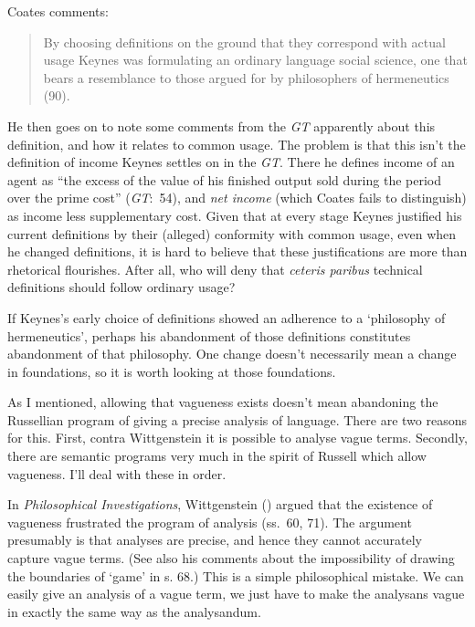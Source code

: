 \documentclass[
  10pt,
  letterpaper,
  DIV=11,
  numbers=noendperiod,
  twoside]{scrartcl}
\begin{document}
Coates comments:

\begin{quote}
By choosing definitions on the ground that they correspond with actual
usage Keynes was formulating an ordinary language social science, one
that bears a resemblance to those argued for by philosophers of
hermeneutics (90).
\end{quote}

He then goes on to note some comments from the \emph{GT} apparently
about this definition, and how it relates to common usage. The problem
is that this isn't the definition of income Keynes settles on in the
\emph{GT}. There he defines income of an agent as ``the excess of the
value of his finished output sold during the period over the prime
cost'' (\emph{GT}:~54), and \emph{net income} (which Coates fails to
distinguish) as income less supplementary cost. Given that at every
stage Keynes justified his current definitions by their (alleged)
conformity with common usage, even when he changed definitions, it is
hard to believe that these justifications are more than rhetorical
flourishes. After all, who will deny that \emph{ceteris paribus}
technical definitions should follow ordinary usage?

If Keynes's early choice of definitions showed an adherence to a
`philosophy of hermeneutics', perhaps his abandonment of those
definitions constitutes abandonment of that philosophy. One change
doesn't necessarily mean a change in foundations, so it is worth looking
at those foundations.

As I mentioned, allowing that vagueness exists doesn't mean abandoning
the Russellian program of giving a precise analysis of language. There
are two reasons for this. First, contra Wittgenstein it is possible to
analyse vague terms. Secondly, there are semantic programs very much in
the spirit of Russell which allow vagueness. I'll deal with these in
order.

In \emph{Philosophical Investigations}, Wittgenstein
() argued that the existence of
vagueness frustrated the program of analysis (ss.~60, 71). The argument
presumably is that analyses are precise, and hence they cannot
accurately capture vague terms. (See also his comments about the
impossibility of drawing the boundaries of `game' in s. 68.) This is a
simple philosophical mistake. We can easily give an analysis of a vague
term, we just have to make the analysans vague in exactly the same way
as the analysandum.
\end{document}
